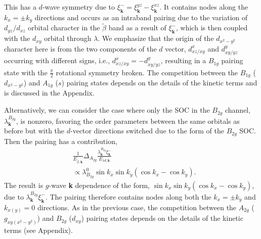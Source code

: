 \documentclass[%
reprint,
superscriptaddress,
 amsmath,amssymb,
 aps,
prb,
nobalancelastpage,
]{revtex4-2}
\begin{document}
This has a $d$-wave symmetry due to $\xi_{\textbf{k}}^{-} = \xi^{yz}_{\textbf{k}}-\xi^{xz}_{\textbf{k}}$.  It contains nodes along the $k_{x}=\pm k_{y}$ directions and occurs as an intraband pairing due to the variation of $d_{yz}/d_{xz}$ orbital character in the $\widetilde{\beta}$ band as a result of $\xi_{\textbf{k}}^{-}$, which is then coupled with the $d_{xy}$ orbital through $\lambda$. We emphasize that the origin of the $d_{x^2-y^2}$ character here is from the two components of the $d$ vector, $d_{xz/xy}^{x}$ and $d_{xy/yz}^{y}$ occurring with different signs, i.e., $d_{xz/xy}^{x}=-d_{xy/yz}^{y}$, resulting in a $B_{1g}$ pairing state with the $\frac{\pi}{2}$ rotational symmetry broken. The competition between the $B_{1g}$ ($d_{x^2-y^2}$) and $A_{1g}$ ($s$) pairing states depends on the details of the kinetic terms and is discussed in the Appendix. 



Alternatively, we can consider the case where only the SOC in the $B_{2g}$ channel, $\lambda_{\textbf{k}}^{B_{2g}}$, is nonzero, favoring the order parameters between the same orbitals as before but with the $d$-vector directions switched due to the form of the $B_{2g}$ SOC. Then the pairing has a contribution, 
\begin{equation}
\label{expectation_b2g}
\begin{aligned}
     &\frac{1}{E_{\widetilde{\beta},\textbf{k}}}{\Delta_{A_{2g}}}\frac{{\lambda_{\textbf{k}}^{B_{2g}}\xi_{\textbf{k}}^{-}}}{E_{1d,\textbf{k}}}\\[6pt]& \propto \lambda_{B_{2g}}^{0}\sin{k_x}\sin{k_y}(\cos{k_x}-\cos{k_y}).
\end{aligned}
\end{equation}
The result is $g$-wave \textbf{k} dependence of the form, $\sin{k_x}\sin{k_y}(\cos{k_x}-\cos{k_y})$, due to $\lambda_{\textbf{k}}^{B_{2g}}\xi_{\textbf{k}}^{-}$. The pairing therefore contains nodes along both the $k_{x}=\pm k_{y}$ and $k_{x(y)}=0$ directions. As in the previous case, the competition between the $A_{2g}$ ($g_{xy(x^2-y^2)}$) and $B_{2g}$ ($d_{xy}$) pairing states depends on the details of the kinetic terms (see Appendix).
\end{document}
